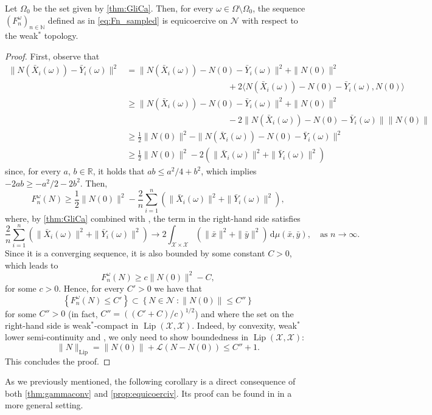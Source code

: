 \documentclass[onefignum,onetabnum]{siamonline250211}
\newcommand{\Lip}{\operatorname{Lip}}
\newcommand{\N}{\mathcal{N}}
\newcommand{\bx}{\bar{x}}
\newcommand{\by}{\bar{y}}
\newcommand{\bX}{\bar{X}}
\newcommand{\bY}{\bar{Y}}
\newcommand{\cL}{\mathcal{L}}
\newcommand{\cX}{\mathcal{X}}
\begin{document}
\begin{prop}\label{prop:equicoerciv} Let $\Omega_0$ be the set given by \cref{thm:GliCa}. Then, for every $\omega \in \Omega\setminus \Omega_0$, the sequence $(F_n^\omega)_{n\in\mathbb{N}}$ defined as in \cref{eq:Fn_sampled} is equicoercive on $\N$ with respect to the weak$^*$ topology.
\end{prop}
\begin{proof} First, observe that
$$
\begin{aligned}
\|N(\bX_i(\omega))-\bY_i(\omega)\|^2&=\|N(\bX_i(\omega))-N(0)-\bY_i(\omega)\|^2+\|N(0)\|^2\\
& \hspace{5cm} +2\langle N(\bX_i(\omega))-N(0)-\bY_i(\omega),N(0)\rangle\\
&\geq \|N(\bX_i(\omega))-N(0)-\bY_i(\omega)\|^2+\|N(0)\|^2\\
& \hspace{5cm} -2\|N(\bX_i(\omega))-N(0)-\bY_i(\omega)\|\|N(0)\|\\
&\geq \frac12\|N(0)\|^2-\|N(\bX_i(\omega))-N(0)-\bY_i(\omega)\|^2\\
&\geq\frac12\|N(0)\|^2-2\left(\|\bX_i(\omega)\|^2+\|\bY_i(\omega)\|^2\right)
\end{aligned}
$$
since, for every $a$, $b\in\mathbb{R}$, it holds that $ab\leq a^2/4+b^2$, which implies $-2ab\geq -a^2/2-2b^2$. Then,
$$
F_n^\omega(N)\geq\frac12\|N(0)\|^2-\frac2n\sum_{i=1}^n\left(\|\bX_i(\omega)\|^2+\|\bY_i(\omega)\|^2\right),
$$
where, by \cref{thm:GliCa} combined with \cite[Theorem 6.9]{Villani2009}, the term in the right-hand side satisfies
$$
\frac2n\sum_{i=1}^n(\|\bX_i(\omega)\|^2+\|\bY_i(\omega)\|^2)\rightarrow 2\int_{\cX\times\cX}\left(\|\bx\|^2+\|\by\|^2\right)\, \mathrm{d}\mu(\bar x, \bar y),\quad \text{as } n\to \infty. 
$$
Since it is a converging sequence, it is also bounded by some constant $C>0$, which leads to
$$
F_n^\omega(N)\geq c\|N(0)\|^2-C,
$$
for some $c>0$. Hence, for every $C'>0$ we have that
$$
\left\{F_n^{\omega}(N)\leq C'\right\}\subset\left\{N\in\N \ \colon \|N(0)\|\leq C''\right\}
$$
for some $C''>0$ (in fact, $C''=((C'+C)/c)^{1/2}$) and where the set on the right-hand side is weak$^*$-compact in $\Lip(\cX, \cX)$. Indeed, by convexity, weak$^*$ lower semi-continuity and \cite[Corollary 2.6.19]{megg}, we only need to show boundedness in $\Lip(\cX, \cX)$:
$$
\|N\|_{\Lip}=\|N(0)\|+\cL(N-N(0))\leq C''+1.
$$
This concludes the proof.
\end{proof}

As we previously mentioned, the following corollary is a direct consequence of both \cref{thm:gammaconv} and \cref{prop:equicoerciv}. Its proof can be found in \cite{braides} in a more general setting. 
\end{document}
